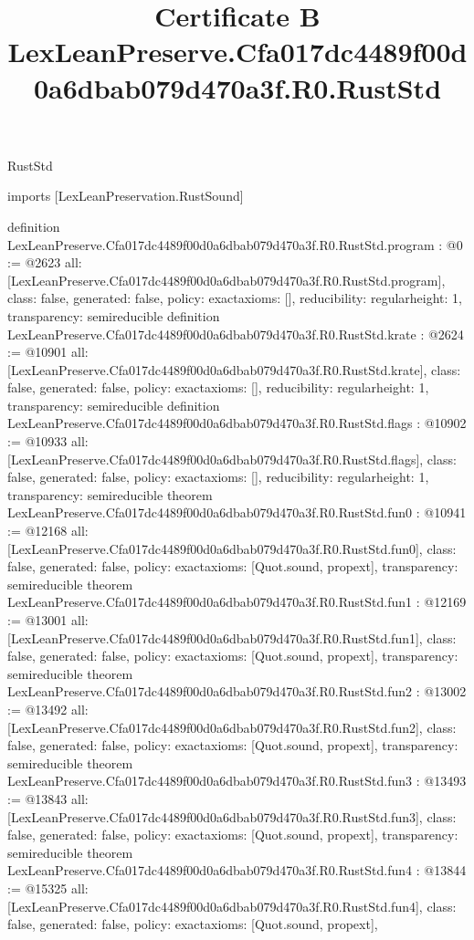 \begin{lexlean}{RustStd}
\title{Certificate B LexLeanPreserve.Cfa017dc4489f00d0a6dbab079d470a3f.R0.RustStd}
\begin{coremodule}
imports [LexLeanPreservation.RustSound]

definition LexLeanPreserve.Cfa017dc4489f00d0a6dbab079d470a3f.R0.RustStd.program : @0 := @2623 {
  all: [LexLeanPreserve.Cfa017dc4489f00d0a6dbab079d470a3f.R0.RustStd.program],
  class: false,
  generated: false,
  policy: exact{axioms: []},
  reducibility: regular{height: 1},
  transparency: semireducible
}
definition LexLeanPreserve.Cfa017dc4489f00d0a6dbab079d470a3f.R0.RustStd.krate : @2624 := @10901 {
  all: [LexLeanPreserve.Cfa017dc4489f00d0a6dbab079d470a3f.R0.RustStd.krate],
  class: false,
  generated: false,
  policy: exact{axioms: []},
  reducibility: regular{height: 1},
  transparency: semireducible
}
definition LexLeanPreserve.Cfa017dc4489f00d0a6dbab079d470a3f.R0.RustStd.flags : @10902 := @10933 {
  all: [LexLeanPreserve.Cfa017dc4489f00d0a6dbab079d470a3f.R0.RustStd.flags],
  class: false,
  generated: false,
  policy: exact{axioms: []},
  reducibility: regular{height: 1},
  transparency: semireducible
}
theorem LexLeanPreserve.Cfa017dc4489f00d0a6dbab079d470a3f.R0.RustStd.fun0 : @10941 := @12168 {
  all: [LexLeanPreserve.Cfa017dc4489f00d0a6dbab079d470a3f.R0.RustStd.fun0],
  class: false,
  generated: false,
  policy: exact{axioms: [Quot.sound, propext]},
  transparency: semireducible
}
theorem LexLeanPreserve.Cfa017dc4489f00d0a6dbab079d470a3f.R0.RustStd.fun1 : @12169 := @13001 {
  all: [LexLeanPreserve.Cfa017dc4489f00d0a6dbab079d470a3f.R0.RustStd.fun1],
  class: false,
  generated: false,
  policy: exact{axioms: [Quot.sound, propext]},
  transparency: semireducible
}
theorem LexLeanPreserve.Cfa017dc4489f00d0a6dbab079d470a3f.R0.RustStd.fun2 : @13002 := @13492 {
  all: [LexLeanPreserve.Cfa017dc4489f00d0a6dbab079d470a3f.R0.RustStd.fun2],
  class: false,
  generated: false,
  policy: exact{axioms: [Quot.sound, propext]},
  transparency: semireducible
}
theorem LexLeanPreserve.Cfa017dc4489f00d0a6dbab079d470a3f.R0.RustStd.fun3 : @13493 := @13843 {
  all: [LexLeanPreserve.Cfa017dc4489f00d0a6dbab079d470a3f.R0.RustStd.fun3],
  class: false,
  generated: false,
  policy: exact{axioms: [Quot.sound, propext]},
  transparency: semireducible
}
theorem LexLeanPreserve.Cfa017dc4489f00d0a6dbab079d470a3f.R0.RustStd.fun4 : @13844 := @15325 {
  all: [LexLeanPreserve.Cfa017dc4489f00d0a6dbab079d470a3f.R0.RustStd.fun4],
  class: false,
  generated: false,
  policy: exact{axioms: [Quot.sound, propext]},
}
\end{coremodule}
\end{lexlean}
